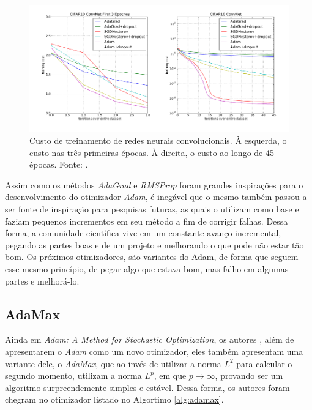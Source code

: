\begin{figure}[h]
    \centering
    \includegraphics[width=0.85\linewidth]{../imagens/retropropagacao-gradiente/comparativo-adam-convnet.png}
    
    \caption[Custo de treinamento de redes neurais convolucionais]{%
        Custo de treinamento de redes neurais convolucionais. À esquerda, o custo nas três primeiras épocas. À direita, o custo ao longo de 45 épocas.
        \newline
        \small Fonte: \parencite{AdamMethod}.
    }
    \label{fig:comparativo-adam-convnet}
\end{figure}

Assim como os métodos \textit{AdaGrad} e \textit{RMSProp} foram grandes inspirações para o desenvolvimento do otimizador \textit{Adam}, é inegável que o mesmo também passou a ser fonte de inspiração para pesquisas futuras, as quais o utilizam como base e faziam pequenos incrementos em seu método a fim de corrigir falhas. Dessa forma, a comunidade científica vive em um constante avanço incremental, pegando as partes boas e de um projeto e melhorando o que pode não estar tão bom. Os próximos otimizadores, são variantes do Adam, de forma que seguem esse mesmo princípio, de pegar algo que estava bom, mas falho em algumas partes e melhorá-lo.

\subsection{AdaMax}

Ainda em \textit{Adam: A Method for Stochastic Optimization}, os autores \textcite{AdamMethod}, além de apresentarem o \textit{Adam} como um novo otimizador, eles também apresentam uma variante dele, o \textit{AdaMax}, que ao invés de utilizar a norma $L^2$ para calcular o segundo momento, utilizam a norma $L^p$, em que $p \to \infty$, provando ser um algoritmo surpreendemente simples e estável. Dessa forma, os autores foram chegram no otimizador listado no Algortimo \ref{alg:adamax}.

